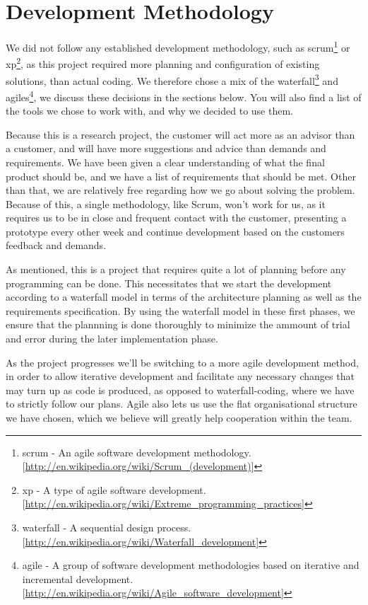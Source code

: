 \section{Development Methodology}\label{Development Methodology} 
    We did not follow any established development methodology, such as \gls{scrum}\footnote{\gls{scrum} - An agile software development methodology. [\url{http://en.wikipedia.org/wiki/Scrum_(development)}]} or \gls{xp}\footnote{\gls{xp} - A type of agile software development. [\url{http://en.wikipedia.org/wiki/Extreme_programming_practices}]}, as this project required more planning and configuration of existing solutions, than actual coding. We therefore chose a mix of the \gls{waterfall}\footnote{\gls{waterfall} - A sequential design process. [\url{http://en.wikipedia.org/wiki/Waterfall_development}]} and \glspl{agile}\footnote{\gls{agile} - A group of software development methodologies based on iterative and incremental development. [\url{http://en.wikipedia.org/wiki/Agile_software_development}]}, we discuss these decisions in the sections below. You will also find a list of the tools we chose to work with, and why we decided to use them. 
    
    Because this is a research project, the customer will act more as an advisor than a customer, and will have more suggestions and advice than demands and requirements. We have been given a clear understanding of what the final product should be, and we have a list of requirements that should be met. Other than that, we are relatively free regarding how we go about solving the problem. Because of this, a single methodology, like Scrum, won't work for us, as it requires us to be in close and frequent contact with the customer, presenting a prototype every other week and continue development based on the customers feedback and demands.
    
    As mentioned, this is a project that requires quite a lot of planning before any programming can be done. This necessitates that we start the development according to a waterfall model in terms of the architecture planning as well as the requirements specification. By using the waterfall model in these first phases, we ensure that the plannning is done thoroughly to minimize the ammount of trial and error during the later implementation phase.
    
    As the project progresses we’ll be switching to a more agile development method, in order to allow iterative development and facilitate any necessary changes that may turn up as code is produced, as opposed to waterfall-coding, where we have to strictly follow our plans. Agile also lets us use the flat organisational structure we have chosen, which we believe will greatly help cooperation within the team.
    
